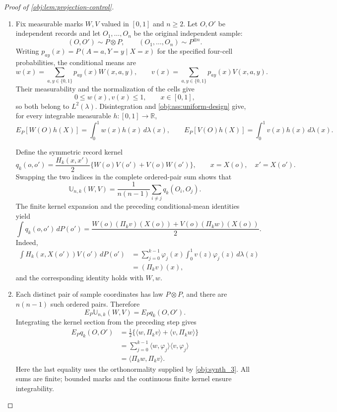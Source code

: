 \begin{proof}[Proof of \cref{obj:lem:projection-control}]
\begin{enumerate}
\item Fix measurable marks \(W,V\) valued in \([0,1]\) and \(n\ge2\). Let \(O,O'\) be independent records and let \(O_1,\ldots,O_n\) be the original independent sample:
\[
(O,O')\sim P\otimes P,
\qquad
(O_1,\ldots,O_n)\sim P^{\otimes n}.
\]
Writing \(p_{ay}(x)=P(A=a,Y=y\mid X=x)\) for the specified four-cell probabilities, the conditional means are
\[
w(x)=\sum_{a,y\in\{0,1\}}p_{ay}(x)W(x,a,y),
\qquad
v(x)=\sum_{a,y\in\{0,1\}}p_{ay}(x)V(x,a,y).
\]
Their measurability and the normalization of the cells give
\[
0\le w(x),v(x)\le1,\qquad x\in[0,1],
\]
so both belong to \(L^2(\lambda)\). Disintegration and
\cref{obj:ass:uniform-design} give, for every integrable measurable \(h:[0,1]\to\mathbb R\),
\[
E_P[W(O)h(X)]=\int_0^1w(x)h(x)\,d\lambda(x),
\qquad
E_P[V(O)h(X)]=\int_0^1v(x)h(x)\,d\lambda(x).
\]

Define the symmetric record kernel
\[
q_k(o,o')
=\frac{H_k(x,x')}{2}
 \{W(o)V(o')+V(o)W(o')\},
\qquad x=X(o),\quad x'=X(o').
\]
Swapping the two indices in the complete ordered-pair sum shows that
\[
\mathbb U_{n,k}(W,V)
=\frac1{n(n-1)}\sum_{i\ne j}q_k(O_i,O_j).
\]
The finite kernel expansion and the preceding conditional-mean identities yield
\[
\int q_k(o,o')\,dP(o')
=\frac{W(o)(\Pi_kv)(X(o))+V(o)(\Pi_kw)(X(o))}{2}.
\]
Indeed,
\[
\begin{aligned}
\int H_k(x,X(o'))V(o')\,dP(o')
&=\sum_{j=0}^{k-1}\varphi_j(x)
  \int_0^1v(z)\varphi_j(z)\,d\lambda(z)\\
&=(\Pi_kv)(x),
\end{aligned}
\]
and the corresponding identity holds with \(W,w\).

\item Each distinct pair of sample coordinates has law \(P\otimes P\), and there are \(n(n-1)\) such ordered pairs. Therefore
\[
E_P\mathbb U_{n,k}(W,V)=E_Pq_k(O,O').
\]
Integrating the kernel section from the preceding step gives
\[
\begin{aligned}
E_Pq_k(O,O')
&=\frac12\{\langle w,\Pi_kv\rangle+\langle v,\Pi_kw\rangle\}\\
&=\sum_{j=0}^{k-1}
 \langle w,\varphi_j\rangle\langle v,\varphi_j\rangle\\
&=\langle\Pi_kw,\Pi_kv\rangle.
\end{aligned}
\]
Here the last equality uses the orthonormality supplied by
\cref{obj:synth_3}. All sums are finite; bounded marks and the continuous finite kernel ensure integrability.


\end{enumerate}
\end{proof}
